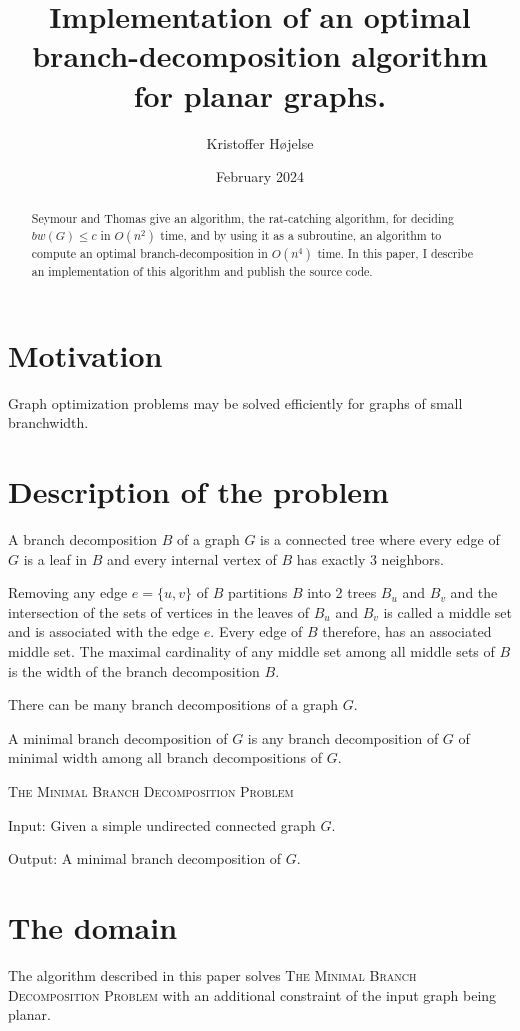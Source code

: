 \documentclass{article}
\title{Implementation of an optimal branch-decomposition algorithm for planar graphs.}
\author{Kristoffer Højelse}
\date{February 2024}
\begin{document}
\maketitle

\begin{abstract}
	Seymour and Thomas give an algorithm, the rat-catching algorithm, for deciding $bw(G) \leq c$ in $O(n^2)$ time, and by using it as a subroutine, an algorithm to compute an optimal branch-decomposition in $O(n^4)$ time. In this paper, I describe an implementation of this algorithm and publish the source code.
\end{abstract}

\section{Motivation}
	Graph optimization problems may be solved efficiently for graphs of small branchwidth.

\section{Description of the problem}
	A branch decomposition $B$ of a graph $G$ is a connected tree where every edge of $G$ is a leaf in $B$ and every internal vertex of $B$ has exactly 3 neighbors.

	Removing any edge $e = \{u,v\}$ of $B$ partitions $B$ into 2 trees $B_u$ and $B_v$ and the intersection of the sets of vertices in the leaves of $B_u$ and $B_v$ is called a middle set and is associated with the edge $e$. Every edge of $B$ therefore, has an associated middle set. The maximal cardinality of any middle set among all middle sets of $B$ is the width of the branch decomposition $B$.

	There can be many branch decompositions of a graph $G$.

	A minimal branch decomposition of $G$ is any branch decomposition of $G$ of minimal width among all branch decompositions of $G$.

	\begin{definition}
		\textsc{The Minimal Branch Decomposition Problem}

		Input: Given a simple undirected connected graph $G$.

		Output: A minimal branch decomposition of $G$.
	\end{definition}


\section{The domain}
	The algorithm described in this paper solves \textsc{The Minimal Branch Decomposition Problem} with an additional constraint of the input graph being planar.
\end{document}
